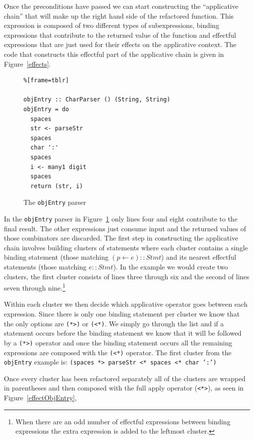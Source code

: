Once the preconditions have passed we can start constructing the ``applicative chain'' that will make up the right hand side of the refactored function. This expression is composed of two different types of subexpressions, binding expressions that contribute to the returned value of the function and effectful expressions that are just used for their effects on the applicative context. The code that constructs this effectful part of the applicative chain is given in Figure~\ref{effects}.

\begin{figure}[t]
\begin{lstlisting}%[frame=tblr]

objEntry :: CharParser () (String, String)
objEntry = do
  spaces
  str <- parseStr
  spaces
  char ':'
  spaces
  i <- many1 digit
  spaces
  return (str, i)
\end{lstlisting}
\caption{The \texttt{objEntry} parser}
\label{objEntry}
\end{figure}

In the \texttt{objEntry} parser in Figure~\ref{objEntry} only lines four and eight contribute to the final result. The other expressions just consume input and the returned values of those combinators are discarded. The first step in constructing the applicative chain involves building clusters of statements where each cluster contains a single binding statement (those matching $(p \leftarrow e) :: Stmt$) and its nearest effectful statements (those matching $e :: Stmt$). In the example we would create two clusters, the first cluster consists of lines three through six and the second of lines seven through nine.\footnote{When there are an odd number of effectful expressions between binding expressions the extra expression is added to the leftmost cluster.}

Within each cluster we then decide which applicative operator goes between each expression. Since there is only one binding statement per cluster we know that the only options are \texttt{(*>)} or \texttt{(<*)}. We simply go through the list and if a statement occurs before the binding statement we know that it will be followed by a \texttt{(*>)} operator and once the binding statement occurs all the remaining expressions are composed with the \texttt{(<*)} operator. The first cluster from the \texttt{objEntry} example is: \texttt{(spaces *> parseStr <* spaces <* char ':')}

Once every cluster has been refactored separately all of the clusters are wrapped in parentheses and then composed with the full apply operator (\texttt{<*>}), as seen in Figure~\ref{effectObjEntry},

